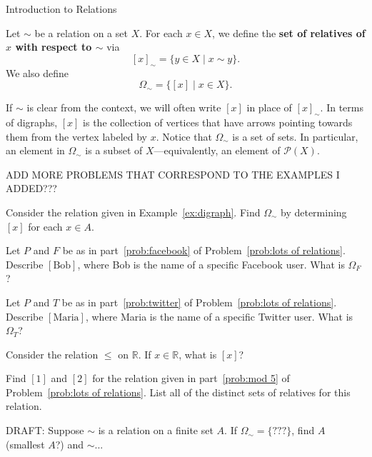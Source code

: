 \begin{section}{Introduction to Relations}
\begin{definition}\label{def:relatives}
Let $\sim$ be a relation on a set $X$. For each $x\in X$, we define the \textbf{set of relatives of $x$ with respect to $\sim$} via
\[
[x]_{\sim}=\{y\in X\mid x\sim y\}.
\]
We also define
\[
\Omega_{\sim}=\{[x]\mid x\in X\}.
\]
\end{definition}

If $\sim$ is clear from the context, we will often write $[x]$ in place of $[x]_{\sim}$.  In terms of digraphs, $[x]$ is the collection of vertices that have arrows pointing towards them from the vertex labeled by $x$. Notice that $\Omega_{\sim}$ is a set of sets.  In particular, an element in $\Omega_{\sim}$ is a subset of $X$---equivalently, an element of $\mathcal{P}(X)$.

ADD MORE PROBLEMS THAT CORRESPOND TO THE EXAMPLES I ADDED???

\begin{problem}
Consider the relation given in Example~\ref{ex:digraph}. Find $\Omega_{\sim}$ by determining $[x]$ for each $x\in A$.
\end{problem}

\begin{problem}
Let $P$ and $F$ be as in part~\ref{prob:facebook} of Problem~\ref{prob:lots of relations}.  Describe $[\text{Bob}]$, where Bob is the name of a specific Facebook user.  What is $\Omega_F$?
\end{problem}

\begin{problem}
Let $P$ and $T$ be as in part~\ref{prob:twitter} of Problem~\ref{prob:lots of relations}.  Describe $[\text{Maria}]$, where Maria is the name of a specific Twitter user.  What is $\Omega_T$?
\end{problem}

\begin{problem}
Consider the relation $\leq$ on $\mathbb{R}$.  If $x\in \mathbb{R}$, what is $[x]$?
\end{problem}

\begin{problem}\label{prob:mod5classes}
Find $[1]$ and $[2]$ for the relation given in part~\ref{prob:mod 5} of Problem~\ref{prob:lots of relations}.  List all of the distinct sets of relatives for this relation.
\end{problem}

\begin{problem}
DRAFT: Suppose $\sim$ is a relation on a finite set $A$.  If $\Omega_{\sim}=\{???\}$, find $A$ (smallest $A$?) and $\sim$...
\end{problem}

\end{section}